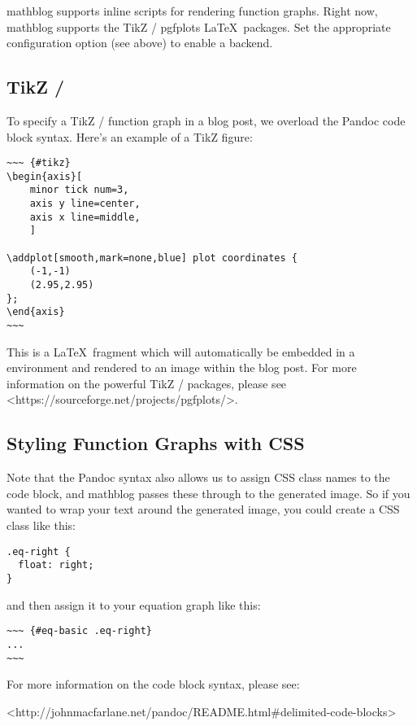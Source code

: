 \documentclass[11pt, letterpaper, oneside, titlepage]{book}
\begin{document}
mathblog supports inline scripts for rendering function graphs.  Right
now, mathblog supports the TikZ / pgfplots \LaTeX\ packages.  Set the
appropriate configuration option (see above) to enable a backend.

\subsection{TikZ / }

To specify a TikZ /  function graph in a blog post, we
overload the Pandoc code block syntax.  Here's an example of a TikZ
figure:

\begin{verbatim}
~~~ {#tikz}
\begin{axis}[
    minor tick num=3,
    axis y line=center,
    axis x line=middle,
    ]

\addplot[smooth,mark=none,blue] plot coordinates {
    (-1,-1)
    (2.95,2.95)
};
\end{axis}
~~~
\end{verbatim}

This is a \LaTeX\ fragment which will automatically be embedded in a
 environment and rendered to an image within the blog
post.  For more information on the powerful TikZ / 
packages, please see <https://sourceforge.net/projects/pgfplots/>.

\subsection{Styling Function Graphs with CSS}

Note that the Pandoc syntax also allows us to assign CSS class names
to the code block, and mathblog passes these through to the generated
image.  So if you wanted to wrap your text around the generated image,
you could create a CSS class like this:

\begin{verbatim}
.eq-right {
  float: right;
}
\end{verbatim}

and then assign it to your equation graph like this:

\begin{verbatim}
~~~ {#eq-basic .eq-right}
...
~~~
\end{verbatim}

For more information on the code block syntax, please see:

<http://johnmacfarlane.net/pandoc/README.html\#delimited-code-blocks>
\end{document}
